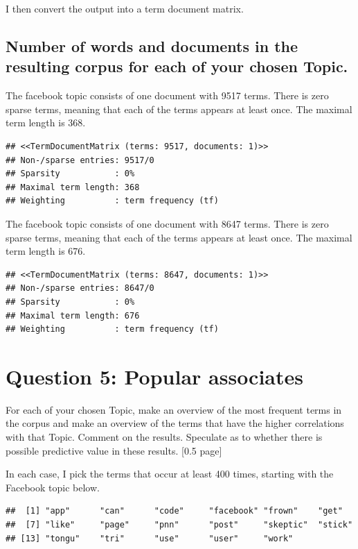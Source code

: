 \documentclass[
]{article}
\begin{document}
I then convert the output into a term document matrix.

\hypertarget{number-of-words-and-documents-in-the-resulting-corpus-for-each-of-your-chosen-topic.}{%
\subsection{Number of words and documents in the resulting corpus for
each of your chosen
Topic.}\label{number-of-words-and-documents-in-the-resulting-corpus-for-each-of-your-chosen-topic.}}

The facebook topic consists of one document with 9517 terms. There is
zero sparse terms, meaning that each of the terms appears at least once.
The maximal term length is 368.

\begin{verbatim}
## <<TermDocumentMatrix (terms: 9517, documents: 1)>>
## Non-/sparse entries: 9517/0
## Sparsity           : 0%
## Maximal term length: 368
## Weighting          : term frequency (tf)
\end{verbatim}

The facebook topic consists of one document with 8647 terms. There is
zero sparse terms, meaning that each of the terms appears at least once.
The maximal term length is 676.

\begin{verbatim}
## <<TermDocumentMatrix (terms: 8647, documents: 1)>>
## Non-/sparse entries: 8647/0
## Sparsity           : 0%
## Maximal term length: 676
## Weighting          : term frequency (tf)
\end{verbatim}

\hypertarget{question-5-popular-associates}{%
\section{\texorpdfstring{\textbf{Question 5: Popular
associates}}{Question 5: Popular associates}}\label{question-5-popular-associates}}

For each of your chosen Topic, make an overview of the most frequent
terms in the corpus and make an overview of the terms that have the
higher correlations with that Topic. Comment on the results. Speculate
as to whether there is possible predictive value in these results.
{[}0.5 page{]}

In each case, I pick the terms that occur at least 400 times, starting
with the Facebook topic below.

\begin{verbatim}
##  [1] "app"      "can"      "code"     "facebook" "frown"    "get"     
##  [7] "like"     "page"     "pnn"      "post"     "skeptic"  "stick"   
## [13] "tongu"    "tri"      "use"      "user"     "work"
\end{verbatim}
\end{document}
